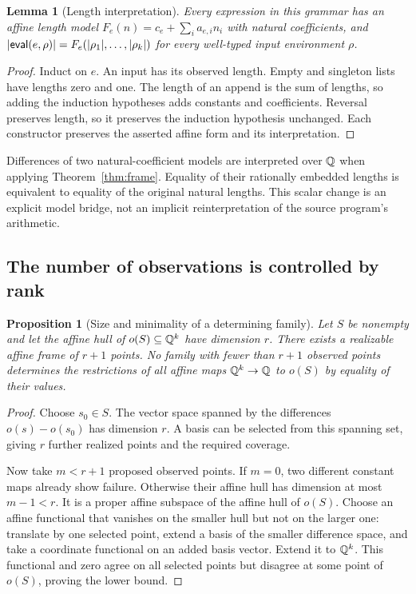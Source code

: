 \documentclass[11pt,letterpaper]{article}
\newtheorem{proposition}[theorem]{Proposition}
\newtheorem{lemma}[theorem]{Lemma}
\theoremstyle{definition}\newtheorem{definition}[theorem]{Definition}
\theoremstyle{remark}\newtheorem{remark}[theorem]{Remark}
\begin{document}
\begin{lemma}[Length interpretation]\label{lem:length}
Every expression in this grammar has an affine length model
$F_e(n)=c_e+\sum_i a_{e,i}n_i$ with natural coefficients, and
$|\mathsf{eval}(e,\rho)|=F_e(|\rho_1|,\ldots,|\rho_k|)$ for every well-typed input
environment $\rho$.
\end{lemma}
\begin{proof}
Induct on $e$. An input has its observed length. Empty and singleton lists have
lengths zero and one. The length of an append is the sum of lengths, so adding
the induction hypotheses adds constants and coefficients. Reversal preserves
length, so it preserves the induction hypothesis unchanged. Each constructor
preserves the asserted affine form and its interpretation.
\end{proof}

Differences of two natural-coefficient models are interpreted over $\mathbb Q$ when
applying Theorem~\ref{thm:frame}. Equality of their rationally embedded lengths
is equivalent to equality of the original natural lengths. This scalar change
is an explicit model bridge, not an implicit reinterpretation of the source
program's arithmetic.

\subsection{The number of observations is controlled by rank}
\begin{proposition}[Size and minimality of a determining family]\label{prop:rank}
Let $S$ be nonempty and let the affine hull of $o(S)\subseteq\mathbb Q^k$ have
dimension $r$. There exists a realizable affine frame of $r+1$ points.
No family with fewer than $r+1$ observed points determines the restrictions of
\emph{all} affine maps $\mathbb Q^k\to\mathbb Q$ to $o(S)$ by equality of their values.
\end{proposition}
\begin{proof}
Choose $s_0\in S$. The vector space spanned by the differences
$o(s)-o(s_0)$ has dimension $r$. A basis can be selected from this spanning
set, giving $r$ further realized points and the required coverage.

Now take $m<r+1$ proposed observed points. If $m=0$, two different constant maps
already show failure. Otherwise their affine hull has dimension at most
$m-1<r$. It is a proper affine subspace of the affine hull of $o(S)$.
Choose an affine functional that vanishes on the smaller hull but not on the
larger one: translate by one selected point, extend a basis of the smaller
difference space, and take a coordinate functional on an added basis vector.
Extend it to $\mathbb Q^k$. This functional and zero agree on all selected points but
disagree at some point of $o(S)$, proving the lower bound.
\end{proof}
\end{document}
